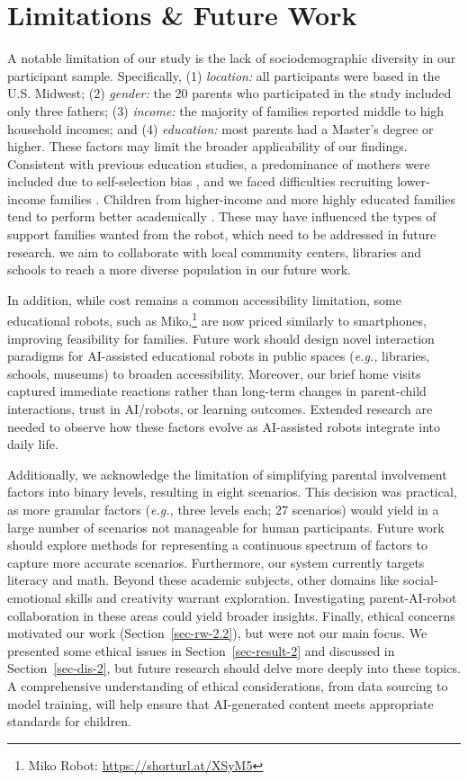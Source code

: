 \section{Limitations \& Future Work}\label{sec-7.4}

A notable limitation of our study is the lack of sociodemographic diversity in our participant sample. Specifically, (1) \textit{location:} all participants were based in the U.S. Midwest; (2) \textit{gender:} the 20 parents who participated in the study included only three fathers; (3) \textit{income:} the majority of families reported middle to high household incomes; and (4) \textit{education:} most parents had a Master's degree or higher. These factors may limit the broader applicability of our findings. Consistent with previous education studies, a predominance of mothers were included due to self-selection bias \cite{schoppe2013comparisons, mcbride1993comparison}, and we faced difficulties recruiting lower-income families \cite{nicholson2011recruitment}. Children from higher-income and more highly educated families tend to perform better academically \cite{sirin2005socioeconomic}. These may have influenced the types of support families wanted from the robot, which need to be addressed in future research. we aim to collaborate with local community centers, libraries and schools to reach a more diverse population in our future work.

In addition, while cost remains a common accessibility limitation, some educational robots, such as Miko,\footnote{Miko Robot: \url{https://shorturl.at/XSyM5}} are now priced similarly to smartphones, improving feasibility for families. Future work should design novel interaction paradigms for AI-assisted educational robots in public spaces (\textit{e.g.,} libraries, schools, museums) to broaden accessibility. Moreover, our brief home visits captured immediate reactions rather than long-term changes in parent-child interactions, trust in AI/robots, or learning outcomes. Extended research are needed to observe how these factors evolve as AI-assisted robots integrate into daily life.

Additionally, we acknowledge the limitation of simplifying parental involvement factors into binary levels, resulting in eight scenarios. This decision was practical, as more granular factors (\textit{e.g.,} three levels each; 27 scenarios) would yield in a large number of scenarios not manageable for human participants. Future work should explore methods for representing a continuous spectrum of factors to capture more accurate scenarios. Furthermore, our system currently targets literacy and math. Beyond these academic subjects, other domains like social-emotional skills and creativity warrant exploration. Investigating parent-AI-robot collaboration in these areas could yield broader insights. Finally, ethical concerns motivated our work (Section~\ref{sec-rw-2.2}), but were not our main focus. We presented some ethical issues in Section~\ref{sec-result-2} and discussed in Section~\ref{sec-dis-2}, but future research should delve more deeply into these topics. A comprehensive understanding of ethical considerations, from data sourcing to model training, will help ensure that AI-generated content meets appropriate standards for children.